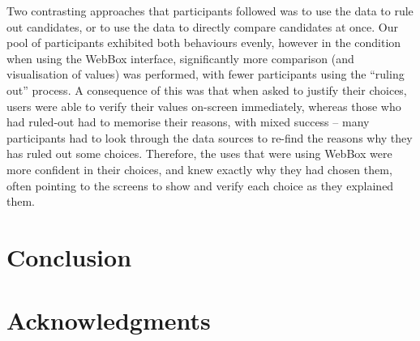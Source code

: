 \documentclass{sigchi}
\begin{document}
Two contrasting approaches that participants followed was to use the data to rule out candidates, or to use the data to
directly compare candidates at once. Our pool of participants exhibited both behaviours evenly, however in the condition
when using the WebBox interface, significantly more comparison (and visualisation of values) was performed, with fewer
participants using the ``ruling out'' process. A consequence of this was that when asked to justify their choices, users were
able to verify their values on-screen immediately, whereas those who had ruled-out had to memorise their reasons, with
mixed success  -- many participants had to look through the data sources to re-find the reasons why they has ruled out some choices.
Therefore, the uses that were using WebBox were more confident in their choices, and knew exactly why they had chosen them,
often pointing to the screens to show and verify each choice as they explained them.

%
%
%









\section{Conclusion} %


\section{Acknowledgments}


%
%
%
%
%
\balance



\end{document}
